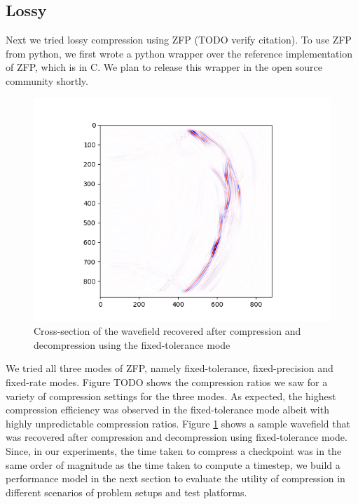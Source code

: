 \documentclass[conference]{IEEEtran}
\begin{document}
\subsection{Lossy}
Next we tried lossy compression using ZFP \cite{ratanaworabhan2006fast} (TODO verify citation). To use ZFP from python, 
we first wrote a python wrapper over the reference implementation of ZFP, which is in C. We plan to release this wrapper
in the open source community shortly. 

\begin{figure}
\begin{center}
\includegraphics[width=0.8\linewidth]{images/decompressed-t-8.png}
\end{center}
\caption{Cross-section of the wavefield recovered after compression and decompression using the fixed-tolerance mode}
\label{fig:decompressed}
\end{figure}

We tried all three modes of ZFP, namely fixed-tolerance, fixed-precision and fixed-rate modes. Figure TODO shows the compression ratios
we saw for a variety of compression settings for the three modes. As expected, the highest compression efficiency was
observed in the fixed-tolerance mode albeit with highly unpredictable compression ratios. Figure \ref{fig:decompressed} shows a sample
wavefield that was recovered after compression and decompression using fixed-tolerance mode. Since, in our experiments, the time
taken to compress a checkpoint was in the same order of magnitude as the time taken to compute a timestep, we build a
performance model in the next section to evaluate the utility of compression in different scenarios of problem setups and test
platforms.
\end{document}

